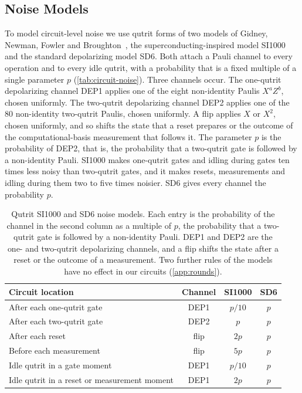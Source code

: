 \subsection{Noise Models}
\label{sub:noise_models}

To model circuit-level noise we use qutrit forms of two models of Gidney, Newman, Fowler and Broughton~\cite{GidneyHoneycomb2021}, the superconducting-inspired model SI1000 and the standard depolarizing model SD6. Both attach a Pauli channel to every operation and to every idle qutrit, with a probability that is a fixed multiple of a single parameter $p$ (\autoref{tab:circuit-noise}). Three channels occur. The one-qutrit depolarizing channel DEP1 applies one of the eight non-identity Paulis $X^a Z^b$, chosen uniformly. The two-qutrit depolarizing channel DEP2 applies one of the $80$ non-identity two-qutrit Paulis, chosen uniformly. A flip applies $X$ or $X^2$, chosen uniformly, and so shifts the state that a reset prepares or the outcome of the computational-basis measurement that follows it. The parameter $p$ is the probability of DEP2, that is, the probability that a two-qutrit gate is followed by a non-identity Pauli. SI1000 makes one-qutrit gates and idling during gates ten times less noisy than two-qutrit gates, and it makes resets, measurements and idling during them two to five times noisier. SD6 gives every channel the probability $p$.

\begin{table}[tb]
  \centering
  \begin{tabular}{l|c|c|c}
    \hline
    Circuit location & Channel & SI1000 & SD6 \\
    \hline
    After each one-qutrit gate & DEP1 & $p/10$ & $p$ \\
    After each two-qutrit gate & DEP2 & $p$ & $p$ \\
    After each reset & flip & $2p$ & $p$ \\
    Before each measurement & flip & $5p$ & $p$ \\
    Idle qutrit in a gate moment & DEP1 & $p/10$ & $p$ \\
    Idle qutrit in a reset or measurement moment & DEP1 & $2p$ & $p$ \\
    \hline
  \end{tabular}
  \caption{Qutrit SI1000 and SD6 noise models. Each entry is the probability of the channel in the second column as a multiple of $p$, the probability that a two-qutrit gate is followed by a non-identity Pauli. DEP1 and DEP2 are the one- and two-qutrit depolarizing channels, and a flip shifts the state after a reset or the outcome of a measurement. Two further rules of the models have no effect in our circuits (\autoref{app:rounds}).}
  \label{tab:circuit-noise}
\end{table}

